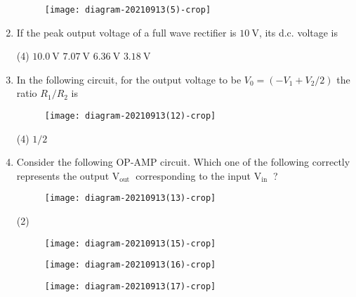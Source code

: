 \begin{enumerate}
\begin{tasks}
 		\task[\textbf{D.}] \begin{figure}[H]
 			\centering
 			\texttt{[image: diagram-20210913(5)-crop]}
 		\end{figure}
 	\end{tasks}
 	\item If the peak output voltage of a full wave rectifier is $10 \mathrm{~V}$, its d.c. voltage is
 	{	}
 	\begin{tasks}(4)
 		\task[\textbf{A.}] $10.0 \mathrm{~V}$
 		\task[\textbf{B.}] $7.07 \mathrm{~V}$
 		\task[\textbf{C.}] $6.36 \mathrm{~V}$
 		\task[\textbf{D.}] $3.18 \mathrm{~V}$
 	\end{tasks}
 	\item In the following circuit, for the output voltage to be $V_{0}=\left(-V_{1}+V_{2} / 2\right)$ the ratio $R_{1} / R_{2}$ is
 	{	}
 	\begin{figure}[H]
 		\centering
 		\texttt{[image: diagram-20210913(12)-crop]}
 	\end{figure}
 	\begin{tasks}(4)
 		\task[\textbf{A.}] $1 / 2$
 	\end{tasks}
 	\item Consider the following OP-AMP circuit.
 	Which one of the following correctly represents the output $\mathrm{V}_{\text {out }}$ corresponding to the input $\mathrm{V}_{\text {in }}$ ?
 	{	}
 	\begin{figure}[H]
 		\centering
 		\texttt{[image: diagram-20210913(13)-crop]}
 	\end{figure}
 	\begin{tasks}(2)
 		\task[\textbf{A.}] \begin{figure}[H]
 			\centering
 			\texttt{[image: diagram-20210913(15)-crop]}
 		\end{figure}
 		\task[\textbf{B.}] \begin{figure}[H]
 			\centering
 			\texttt{[image: diagram-20210913(16)-crop]}
 		\end{figure}
 		\task[\textbf{C.}] \begin{figure}[H]
 			\centering
 			\texttt{[image: diagram-20210913(17)-crop]}
 		\end{figure}
 		\task[\textbf{D.}] \begin{figure}[H]
 			\centering

\end{figure}
\end{tasks}
\end{enumerate}
